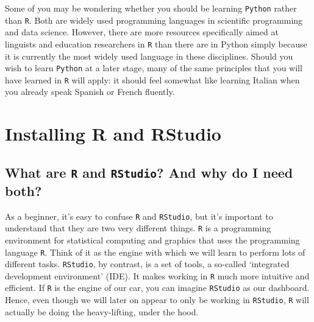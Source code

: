 \documentclass[
  letterpaper,
  DIV=11,
  numbers=noendperiod,
  oneside]{scrreprt}
\begin{document}
Some of you may be wondering whether you should be learning
\texttt{Python} rather than \texttt{R}. Both are widely used programming
languages in scientific programming and data science. However, there are
more resources specifically aimed at linguists and education researchers
in \texttt{R} than there are in Python simply because it is currently
the most widely used language in these disciplines. Should you wish to
learn \texttt{Python} at a later stage, many of the same principles that
you will have learned in \texttt{R} will apply: it should feel somewhat
like learning Italian when you already speak Spanish or French fluently.

\section{Installing R and RStudio}\label{installing-r-and-rstudio-1}

\subsection{\texorpdfstring{What are \texttt{R} and \texttt{RStudio}?
And why do I need
both?}{What are R and RStudio? And why do I need both?}}\label{what-are-r-and-rstudio-and-why-do-i-need-both}

As a beginner, it's easy to confuse \texttt{R} and \texttt{RStudio}, but
it's important to understand that they are two very different things.
\texttt{R} is a programming environment for statistical computing and
graphics that uses the programming language \texttt{R}. Think of it as
the engine with which we will learn to perform lots of different tasks.
\texttt{RStudio}, by contrast, is a set of tools, a so-called
`integrated development environment' (IDE). It makes working in
\texttt{R} much more intuitive and efficient. If \texttt{R} is the
engine of our car, you can imagine \texttt{RStudio} as our dashboard.
Hence, even though we will later on appear to only be working in
\texttt{RStudio}, \texttt{R} will actually be doing the heavy-lifting,
under the hood.
\end{document}
